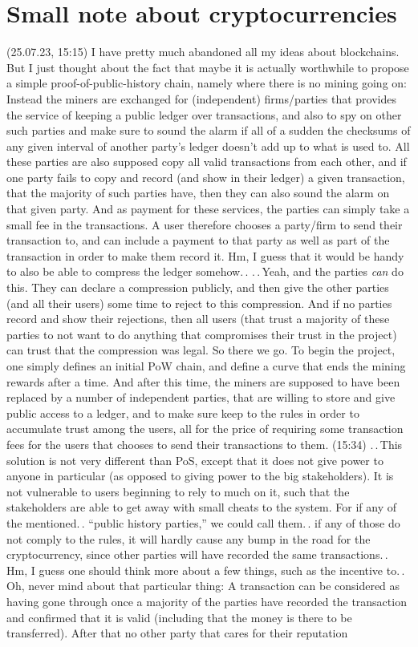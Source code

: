 \documentclass{report}
\begin{document}
\section{Small note about cryptocurrencies}

(25.07.23, 15:15) I have pretty much abandoned all my ideas about blockchains. But I just thought about the fact that maybe it is actually worthwhile to propose a simple proof-of-public-history chain, namely where there is no mining going on: Instead the miners are exchanged for (independent) firms/parties that provides the service of keeping a public ledger over transactions, and also to spy on other such parties and make sure to sound the alarm if all of a sudden the checksums of any given interval of another party's ledger doesn't add up to what is used to. All these parties are also supposed copy all valid transactions from each other, and if one party fails to copy and record (and show in their ledger) a given transaction, that the majority of such parties have, then they can also sound the alarm on that given party. And as payment for these services, the parties can simply take a small fee in the transactions. A user therefore chooses a party/firm to send their transaction to, and can include a payment to that party as well as part of the transaction in order to make them record it. Hm, I guess that it would be handy to also be able to compress the ledger somehow.\,. .\,.\,Yeah, and the parties \emph{can} do this. They can declare a compression publicly, and then give the other parties (and all their users) some time to reject to this compression. And if no parties record and show their rejections, then all users (that trust a majority of these parties to not want to do anything that compromises their trust in the project) can trust that the compression was legal. So there we go. To begin the project, one simply defines an initial PoW chain, and define a curve that ends the mining rewards after a time. And after this time, the miners are supposed to have been replaced by a number of independent parties, that are willing to store and give public access to a ledger, and to make sure keep to the rules in order to accumulate trust among the users, all for the price of requiring some transaction fees for the users that chooses to send their transactions to them. (15:34) .\,.\,This solution is not very different than PoS, except that it does not give power to anyone in particular (as opposed to giving power to the big stakeholders). It is not vulnerable to users beginning to rely to much on it, such that the stakeholders are able to get away with small cheats to the system. For if any of the mentioned.\,. ``public history parties,'' we could call them.\,. if any of those do not comply to the rules, it will hardly cause any bump in the road for the cryptocurrency, since other parties will have recorded the same transactions.\,. Hm, I guess one should think more about a few things, such as the incentive to.\,. Oh, never mind about that particular thing: A transaction can be considered as having gone through once a majority of the parties have recorded the transaction and confirmed that it is valid (including that the money is there to be transferred). After that no other party that cares for their reputation 
\end{document}

